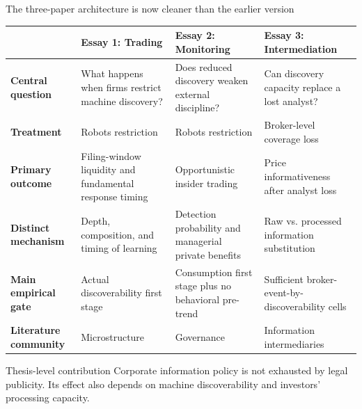 \documentclass[aspectratio=169,10pt]{beamer}
\begin{document}
\begin{frame}[t]{The three-paper architecture is now cleaner than the earlier version}
\scriptsize
\renewcommand{\arraystretch}{1.18}
\setlength{\tabcolsep}{0.10cm}
\begin{tabularx}{\textwidth}{>{\bfseries\RaggedRight\arraybackslash}p{2.15cm} >{\RaggedRight\arraybackslash}X >{\RaggedRight\arraybackslash}X >{\RaggedRight\arraybackslash}X}
\toprule
 & \textbf{Essay 1: Trading} & \textbf{Essay 2: Monitoring} & \textbf{Essay 3: Intermediation} \\
\midrule
Central question & What happens when firms restrict machine discovery? & Does reduced discovery weaken external discipline? & Can discovery capacity replace a lost analyst? \\
Treatment & Robots restriction & Robots restriction & Broker-level coverage loss \\
Primary outcome & Filing-window liquidity and fundamental response timing & Opportunistic insider trading & Price informativeness after analyst loss \\
Distinct mechanism & Depth, composition, and timing of learning & Detection probability and managerial private benefits & Raw vs. processed information substitution \\
Main empirical gate & Actual discoverability first stage & Consumption first stage plus no behavioral pre-trend & Sufficient broker-event-by-discoverability cells \\
Literature community & Microstructure & Governance & Information intermediaries \\
\bottomrule
\end{tabularx}

\begin{block}{Thesis-level contribution}
\scriptsize Corporate information policy is not exhausted by legal publicity. Its effect also depends on machine discoverability and investors' processing capacity.
\end{block}
\end{frame}
\end{document}
